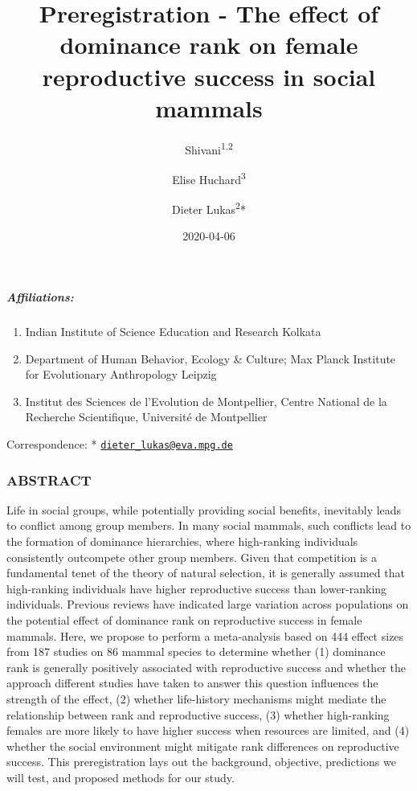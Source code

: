 \documentclass[]{article}
\title{Preregistration - The effect of dominance rank on female reproductive
success in social mammals}
\author{Shivani\textsuperscript{1,2} \and Elise Huchard\textsuperscript{3} \and Dieter Lukas\textsuperscript{2}*}
\date{2020-04-06}
\providecommand{\tightlist}{%
  \setlength{\itemsep}{0pt}\setlength{\parskip}{0pt}}
\let\oldsubparagraph\subparagraph
\renewcommand{\subparagraph}[1]{\oldsubparagraph{#1}\mbox{}}
\begin{document}
\maketitle

\hypertarget{affiliations}{%
\subparagraph{Affiliations:}\label{affiliations}}

\begin{enumerate}
\def\labelenumi{\arabic{enumi}.}
\tightlist
\item
  Indian Institute of Science Education and Research Kolkata
\item
  Department of Human Behavior, Ecology \& Culture; Max Planck Institute
  for Evolutionary Anthropology Leipzig
\item
  Institut des Sciences de l'Evolution de Montpellier, Centre National
  de la Recherche Scientifique, Université de Montpellier
\end{enumerate}

Correspondence: *
\href{mailto:dieter_lukas@eva.mpg.de}{\nolinkurl{dieter\_lukas@eva.mpg.de}}

\hypertarget{abstract}{%
\subsubsection{ABSTRACT}\label{abstract}}

Life in social groups, while potentially providing social benefits,
inevitably leads to conflict among group members. In many social
mammals, such conflicts lead to the formation of dominance hierarchies,
where high-ranking individuals consistently outcompete other group
members. Given that competition is a fundamental tenet of the theory of
natural selection, it is generally assumed that high-ranking individuals
have higher reproductive success than lower-ranking individuals.
Previous reviews have indicated large variation across populations on
the potential effect of dominance rank on reproductive success in female
mammals. Here, we propose to perform a meta-analysis based on 444 effect
sizes from 187 studies on 86 mammal species to determine whether (1)
dominance rank is generally positively associated with reproductive
success and whether the approach different studies have taken to answer
this question influences the strength of the effect, (2) whether
life-history mechanisms might mediate the relationship between rank and
reproductive success, (3) whether high-ranking females are more likely
to have higher success when resources are limited, and (4) whether the
social environment might mitigate rank differences on reproductive
success. This preregistration lays out the background, objective,
predictions we will test, and proposed methods for our study.
\end{document}
